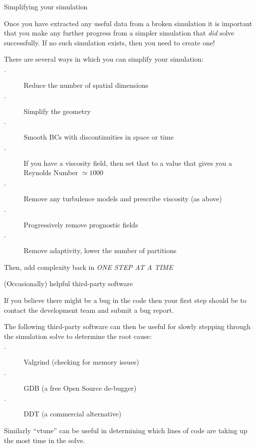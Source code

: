 \documentclass[professionalfonts, 8pt]{beamer}
\begin{document}

\begin{frame}{Simplifying your simulation}

Once you have extracted any useful data from a broken simulation
it is important that you make any further progress from a simpler simulation that {\it did} solve successfully.
If no such simulation exists, then you need to create one!

\vspace{1ex}
There are several ways in which you can simplify your simulation:

\begin{description}
 \item[$\cdot$] Reduce the number of spatial dimensions
 \item[$\cdot$] Simplify the geometry 
 \item[$\cdot$] Smooth BCs with discontinuities in space or time
 \item[$\cdot$] If you have a viscosity field, then set that to a value that gives you a Reynolds Number $\simeq 1000$
 \item[$\cdot$] Remove any turbulence models and prescribe viscosity (as above)
 \item[$\cdot$] Progressively remove prognostic fields
 \item[$\cdot$] Remove adaptivity, lower the number of partitions
\end{description}

Then, add complexity back in \emph{\color{red}ONE STEP AT A TIME}

\end{frame}


\begin{frame}{(Occasionally) helpful third-party software}

If you believe there might be a bug in the code
then your first step should be to contact the development team and submit a bug report.

\vspace{1ex}
The following third-party software can then be useful for slowly stepping through the simulation solve to determine the root cause:
\vspace{1ex}

\begin{description}
 \item[$\cdot$] Valgrind (checking for memory issues)
 \item[$\cdot$] GDB (a free Open Source de-bugger)
 \item[$\cdot$] DDT (a commercial alternative) 
\end{description}

Similarly ``vtune'' can be useful in determining which lines of code are taking up the most time in the solve.

\end{frame}
\end{document}
